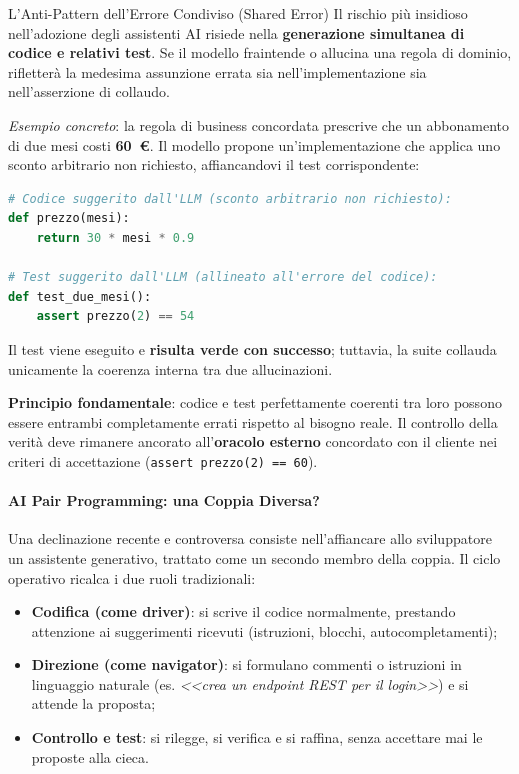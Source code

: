 \documentclass[12pt]{extarticle}
\begin{document}
\begin{cbox}{L'Anti-Pattern dell'Errore Condiviso (Shared Error)}
\noindent Il rischio più insidioso nell'adozione degli assistenti AI risiede nella \textbf{generazione simultanea di codice e relativi test}. Se il modello fraintende o allucina una regola di dominio, rifletterà la medesima assunzione errata sia nell'implementazione sia nell'asserzione di collaudo.
\medskip

\noindent \textit{Esempio concreto}: la regola di business concordata prescrive che un abbonamento di due mesi costi \textbf{60~€}. Il modello propone un'implementazione che applica uno sconto arbitrario non richiesto, affiancandovi il test corrispondente:
\begin{lstlisting}[language=Python]
# Codice suggerito dall'LLM (sconto arbitrario non richiesto):
def prezzo(mesi):
    return 30 * mesi * 0.9

# Test suggerito dall'LLM (allineato all'errore del codice):
def test_due_mesi():
    assert prezzo(2) == 54
\end{lstlisting}
\noindent Il test viene eseguito e \textbf{risulta verde con successo}; tuttavia, la suite collauda unicamente la coerenza interna tra due allucinazioni. 

\medskip
\noindent \textbf{Principio fondamentale}: codice e test perfettamente coerenti tra loro possono essere entrambi completamente errati rispetto al bisogno reale. Il controllo della verità deve rimanere ancorato all'\textbf{oracolo esterno} concordato con il cliente nei criteri di accettazione (\texttt{assert prezzo(2) == 60}).
\end{cbox}

\paragraph{AI Pair Programming: una Coppia Diversa?}
Una declinazione recente e controversa consiste nell'affiancare allo sviluppatore un assistente generativo, trattato come un secondo membro della coppia. Il ciclo operativo ricalca i due ruoli tradizionali:
\begin{itemize}
    \item \textbf{Codifica (come driver)}: si scrive il codice normalmente, prestando attenzione ai suggerimenti ricevuti (istruzioni, blocchi, autocompletamenti);
    \item \textbf{Direzione (come navigator)}: si formulano commenti o istruzioni in linguaggio naturale (es. \textit{<<crea un endpoint REST per il login>>}) e si attende la proposta;
    \item \textbf{Controllo e test}: si rilegge, si verifica e si raffina, senza accettare mai le proposte alla cieca.
\end{itemize}
\end{document}
